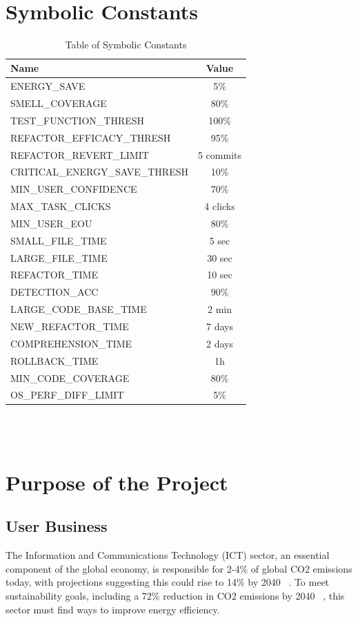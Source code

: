 \documentclass[12pt]{article}
\begin{document}
~\newpage

\section*{Symbolic Constants}
\begin{table}[H]
  \centering
  \begin{tabular}{|l|c|}
    \toprule \textbf{Name} & \textbf{Value} \\
    \midrule
    ENERGY\_SAVE & 5\% \\
    SMELL\_COVERAGE & 80\% \\
    TEST\_FUNCTION\_THRESH & 100\% \\
    REFACTOR\_EFFICACY\_THRESH & 95\% \\
    REFACTOR\_REVERT\_LIMIT & 5 commits \\
    CRITICAL\_ENERGY\_SAVE\_THRESH & 10\% \\
    MIN\_USER\_CONFIDENCE & 70\% \\
    MAX\_TASK\_CLICKS & 4 clicks \\
    MIN\_USER\_EOU & 80\% \\
    SMALL\_FILE\_TIME & 5 sec \\
    LARGE\_FILE\_TIME & 30 sec \\
    REFACTOR\_TIME & 10 sec \\
    DETECTION\_ACC & 90\% \\
    LARGE\_CODE\_BASE\_TIME & 2 min \\
    NEW\_REFACTOR\_TIME & 7 days \\
    COMPREHENSION\_TIME & 2 days \\
    ROLLBACK\_TIME & 1h \\
    MIN\_CODE\_COVERAGE & 80\% \\
    OS\_PERF\_DIFF\_LIMIT & 5\% \\
    \bottomrule
  \end{tabular}
  \caption{Table of Symbolic Constants}
  \label{tab:syms}
\end{table}

~\\

~\newpage


\section{Purpose of the Project}
\subsection{User Business}
The Information and Communications Technology (ICT) sector, an
essential component of the global economy, is responsible for 2-4\%
of global CO2 emissions today, with projections suggesting this could
rise to 14\% by 2040 ~\citep{BelkhirAndElmeligi2018}. To meet
sustainability goals, including a 72\% reduction in CO2 emissions by
2040 ~\citep{FreitagAndBernersLee2021}, this sector must find ways to
improve energy efficiency.
\end{document}
